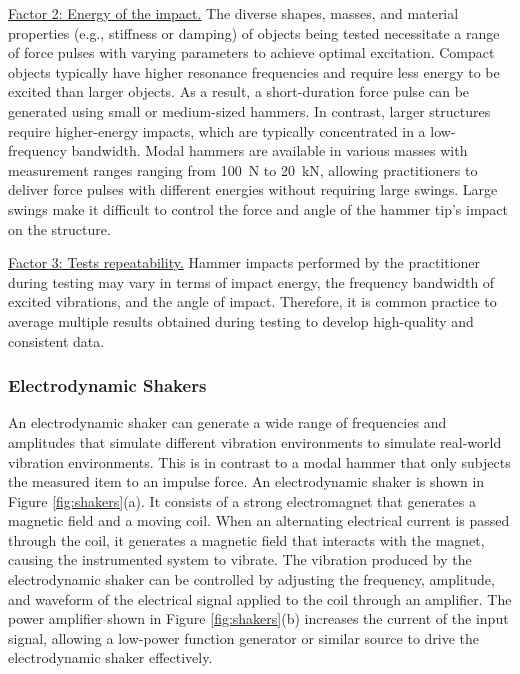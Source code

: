\documentclass[12pt,letter]{article}
\begin{document}
\underline{Factor 2: Energy of the impact.} The diverse shapes, masses, and material properties (e.g., stiffness or damping) of objects being tested necessitate a range of force pulses with varying parameters to achieve optimal excitation. Compact objects typically have higher resonance frequencies and require less energy to be excited than larger objects. As a result, a short-duration force pulse can be generated using small or medium-sized hammers. In contrast, larger structures require higher-energy impacts, which are typically concentrated in a low-frequency bandwidth. Modal hammers are available in various masses with measurement ranges ranging from 100~N to 20~kN, allowing practitioners to deliver force pulses with different energies without requiring large swings. Large swings make it difficult to control the force and angle of the hammer tip's impact on the structure.


\underline{Factor 3: Tests repeatability.} Hammer impacts performed by the practitioner during testing may vary in terms of impact energy, the frequency bandwidth of excited vibrations, and the angle of impact. Therefore, it is common practice to average multiple results obtained during testing to develop high-quality and consistent data.











\subsubsection{Electrodynamic Shakers}

An electrodynamic shaker can generate a wide range of frequencies and amplitudes that simulate different vibration environments to simulate real-world vibration environments. This is in contrast to a modal hammer that only subjects the measured item to an impulse force. An electrodynamic shaker is shown in Figure \ref{fig:shakers}(a). It consists of a strong electromagnet that generates a magnetic field and a moving coil. When an alternating electrical current is passed through the coil, it generates a magnetic field that interacts with the magnet, causing the instrumented system to vibrate. The vibration produced by the electrodynamic shaker can be controlled by adjusting the frequency, amplitude, and waveform of the electrical signal applied to the coil through an amplifier. The power amplifier shown in Figure \ref{fig:shakers}(b) increases the current of the input signal, allowing a low-power function generator or similar source to drive the electrodynamic shaker effectively.
\end{document}
